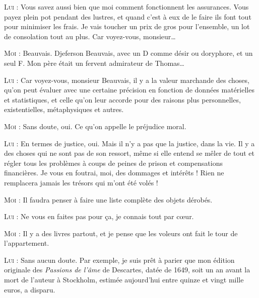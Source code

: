 \begin{dialogue}
\textsc{Lui} : Vous savez aussi bien que moi comment fonctionnent les assurances. Vous payez plein pot pendant des lustres, et quand c’est à eux de le faire ils font tout pour minimiser les frais. Je vais toucher un prix de gros pour l’ensemble, un lot de consolation tout au plus. Car voyez-vous, monsieur…

\textsc{Moi} : Beauvais. Djeferson Beauvais, avec un D comme désir ou doryphore, et un seul F. Mon père était un fervent admirateur de Thomas…

\textsc{Lui} : Car voyez-vous, monsieur Beauvais, il y a la valeur marchande des choses, qu’on peut évaluer avec une certaine précision en fonction de données matérielles et statistiques, et celle qu’on leur accorde pour des raisons plus personnelles, existentielles, métaphysiques et autres.

\textsc{Moi} : Sans doute, oui. Ce qu’on appelle le préjudice moral.

\textsc{Lui} : En termes de justice, oui. Mais il n’y a pas que la justice, dans la vie. Il y a des choses qui ne sont pas de son ressort, même si elle entend se mêler de tout et régler tous les problèmes à coups de peines de prison et compensations financières. Je vous en foutrai, moi, des dommages et intérêts ! Rien ne remplacera jamais les trésors qui m’ont été volés !

\textsc{Moi} : Il faudra penser à faire une liste complète des objets dérobés.

\textsc{Lui} : Ne vous en faites pas pour ça, je connais tout par cœur.

\textsc{Moi} : Il y a des livres partout, et je pense que les voleurs ont fait le tour de l’appartement.

%
%
%
\textsc{Lui} : Sans aucun doute. Par exemple, je suis prêt à parier que mon édition originale des \textit{Passions de l’âme} de Descartes, datée de 1649, soit un an avant la mort de l’auteur à Stockholm, estimée aujourd’hui entre quinze et vingt mille euros, a disparu.


\end{dialogue}
